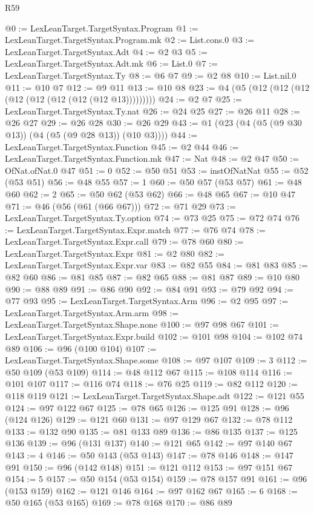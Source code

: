 \begin{lexlean}{R59}
\begin{coremodule}
@0 := LexLeanTarget.TargetSyntax.Program
@1 := LexLeanTarget.TargetSyntax.Program.mk
@2 := List.cons.{0}
@3 := LexLeanTarget.TargetSyntax.Adt
@4 := @2 @3
@5 := LexLeanTarget.TargetSyntax.Adt.mk
@6 := List.{0}
@7 := LexLeanTarget.TargetSyntax.Ty
@8 := @6 @7
@9 := @2 @8
@10 := List.nil.{0}
@11 := @10 @7
@12 := @9 @11
@13 := @10 @8
@23 := @4 (@5 (@12 (@12 (@12 (@12 (@12 (@12 (@12 (@12 @13)))))))))
@24 := @2 @7
@25 := LexLeanTarget.TargetSyntax.Ty.nat
@26 := @24 @25
@27 := @26 @11
@28 := @26 @27
@29 := @26 @28
@30 := @26 @29
@43 := @1 (@23 (@4 (@5 (@9 @30 @13)) (@4 (@5 (@9 @28 @13)) (@10 @3))))
@44 := LexLeanTarget.TargetSyntax.Function
@45 := @2 @44
@46 := LexLeanTarget.TargetSyntax.Function.mk
@47 := Nat
@48 := @2 @47
@50 := OfNat.ofNat.{0} @47
@51 := 0
@52 := @50 @51
@53 := instOfNatNat
@55 := @52 (@53 @51)
@56 := @48 @55
@57 := 1
@60 := @50 @57 (@53 @57)
@61 := @48 @60
@62 := 2
@65 := @50 @62 (@53 @62)
@66 := @48 @65
@67 := @10 @47
@71 := @46 (@56 (@61 (@66 @67)))
@72 := @71 @29
@73 := LexLeanTarget.TargetSyntax.Ty.option
@74 := @73 @25
@75 := @72 @74
@76 := LexLeanTarget.TargetSyntax.Expr.match
@77 := @76 @74
@78 := LexLeanTarget.TargetSyntax.Expr.call
@79 := @78 @60
@80 := LexLeanTarget.TargetSyntax.Expr
@81 := @2 @80
@82 := LexLeanTarget.TargetSyntax.Expr.var
@83 := @82 @55
@84 := @81 @83
@85 := @82 @60
@86 := @81 @85
@87 := @82 @65
@88 := @81 @87
@89 := @10 @80
@90 := @88 @89
@91 := @86 @90
@92 := @84 @91
@93 := @79 @92
@94 := @77 @93
@95 := LexLeanTarget.TargetSyntax.Arm
@96 := @2 @95
@97 := LexLeanTarget.TargetSyntax.Arm.arm
@98 := LexLeanTarget.TargetSyntax.Shape.none
@100 := @97 @98 @67
@101 := LexLeanTarget.TargetSyntax.Expr.build
@102 := @101 @98
@104 := @102 @74 @89
@106 := @96 (@100 @104)
@107 := LexLeanTarget.TargetSyntax.Shape.some
@108 := @97 @107
@109 := 3
@112 := @50 @109 (@53 @109)
@114 := @48 @112 @67
@115 := @108 @114
@116 := @101 @107
@117 := @116 @74
@118 := @76 @25
@119 := @82 @112
@120 := @118 @119
@121 := LexLeanTarget.TargetSyntax.Shape.adt
@122 := @121 @55
@124 := @97 @122 @67
@125 := @78 @65
@126 := @125 @91
@128 := @96 (@124 @126)
@129 := @121 @60
@131 := @97 @129 @67
@132 := @78 @112
@133 := @132 @90
@135 := @81 @133 @89
@136 := @86 @135
@137 := @125 @136
@139 := @96 (@131 @137)
@140 := @121 @65
@142 := @97 @140 @67
@143 := 4
@146 := @50 @143 (@53 @143)
@147 := @78 @146
@148 := @147 @91
@150 := @96 (@142 @148)
@151 := @121 @112
@153 := @97 @151 @67
@154 := 5
@157 := @50 @154 (@53 @154)
@159 := @78 @157 @91
@161 := @96 (@153 @159)
@162 := @121 @146
@164 := @97 @162 @67
@165 := 6
@168 := @50 @165 (@53 @165)
@169 := @78 @168
@170 := @86 @89

\end{coremodule}
\end{lexlean}
